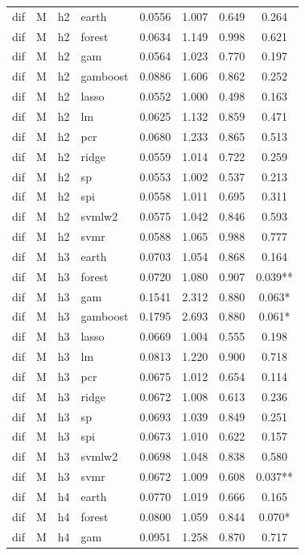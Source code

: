 \begin{ThreePartTable}
\begin{longtable}[t]{llclcccc}
dif & M & h2 & earth & 0.0556 & 1.007 & 0.649 & 0.264\\
dif & M & h2 & forest & 0.0634 & 1.149 & 0.998 & 0.621\\
dif & M & h2 & gam & 0.0564 & 1.023 & 0.770 & 0.197\\
dif & M & h2 & gamboost & 0.0886 & 1.606 & 0.862 & 0.252\\
dif & M & h2 & lasso & 0.0552 & 1.000 & 0.498 & 0.163\\
dif & M & h2 & lm & 0.0625 & 1.132 & 0.859 & 0.471\\
dif & M & h2 & pcr & 0.0680 & 1.233 & 0.865 & 0.513\\
dif & M & h2 & ridge & 0.0559 & 1.014 & 0.722 & 0.259\\
dif & M & h2 & sp & 0.0553 & 1.002 & 0.537 & 0.213\\
dif & M & h2 & spi & 0.0558 & 1.011 & 0.695 & 0.311\\
dif & M & h2 & svmlw2 & 0.0575 & 1.042 & 0.846 & 0.593\\
dif & M & h2 & svmr & 0.0588 & 1.065 & 0.988 & 0.777\\
\addlinespace
dif & M & h3 & earth & 0.0703 & 1.054 & 0.868 & 0.164\\
dif & M & h3 & forest & 0.0720 & 1.080 & 0.907 & 0.039**\\
dif & M & h3 & gam & 0.1541 & 2.312 & 0.880 & 0.063*\\
dif & M & h3 & gamboost & 0.1795 & 2.693 & 0.880 & 0.061*\\
dif & M & h3 & lasso & 0.0669 & 1.004 & 0.555 & 0.198\\
dif & M & h3 & lm & 0.0813 & 1.220 & 0.900 & 0.718\\
dif & M & h3 & pcr & 0.0675 & 1.012 & 0.654 & 0.114\\
dif & M & h3 & ridge & 0.0672 & 1.008 & 0.613 & 0.236\\
dif & M & h3 & sp & 0.0693 & 1.039 & 0.849 & 0.251\\
dif & M & h3 & spi & 0.0673 & 1.010 & 0.622 & 0.157\\
dif & M & h3 & svmlw2 & 0.0698 & 1.048 & 0.838 & 0.580\\
dif & M & h3 & svmr & 0.0672 & 1.009 & 0.608 & 0.037**\\
\addlinespace
dif & M & h4 & earth & 0.0770 & 1.019 & 0.666 & 0.165\\
dif & M & h4 & forest & 0.0800 & 1.059 & 0.844 & 0.070*\\
dif & M & h4 & gam & 0.0951 & 1.258 & 0.870 & 0.717\\

\end{longtable}
\end{ThreePartTable}
